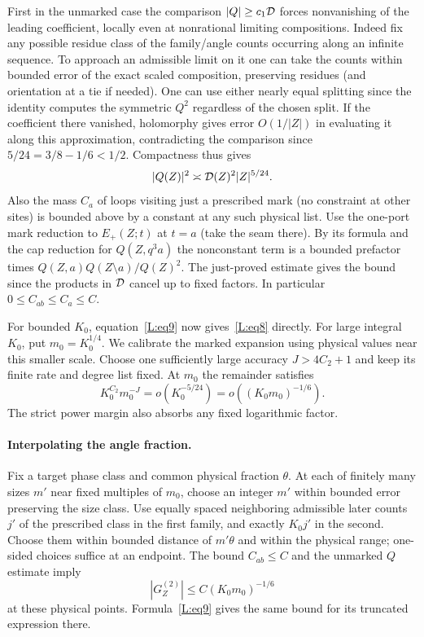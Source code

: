 \documentclass[11pt]{article}
\numberwithin{equation}{section}
\theoremstyle{definition}\newtheorem{definition}[theorem]{Definition}
\theoremstyle{remark}\newtheorem{remark}[theorem]{Remark}
\begin{document}
First in the unmarked case the comparison \(|Q|\ge c_1{\cal D}\) forces nonvanishing of the leading coefficient, locally even at nonrational limiting compositions. Indeed fix any possible residue class of the family/angle counts occurring along an infinite sequence. To approach an admissible limit on it one can take the counts within bounded error of the exact scaled composition, preserving residues (and orientation at a tie if needed). One can use either nearly equal splitting since the identity computes the symmetric \(Q^2\) regardless of the chosen split. If the coefficient there vanished, holomorphy gives error \(O(1/|Z|)\) in evaluating it along this approximation, contradicting the comparison since \(5/24=3/8-1/6<1/2\). Compactness thus gives
\[
 |Q(Z)|^2\asymp {\cal D}(Z)^2 |Z|^{5/24}.
\]
Also the mass \(C_a\) of loops visiting just a prescribed mark (no constraint at other sites) is bounded above by a constant at any such physical list. Use the one-port mark reduction to \(E_+(Z;t)\) at \(t=a\) (take the seam there). By its formula and the cap reduction for \(Q(Z,q^3a)\) the nonconstant term is a bounded prefactor times \(Q(Z,a)Q(Z\setminus a)/Q(Z)^2\). The just-proved estimate gives the bound since the products in \({\cal D}\) cancel up to fixed factors. In particular \(0\le C_{ab}\le C_a\le C\).

For bounded $K_0$, equation~\eqref{L:eq9} now gives~\eqref{L:eq8}
directly. For large integral $K_0$, put $m_0=K_0^{1/4}$. We calibrate
the marked expansion using physical values near this smaller scale.
Choose one sufficiently large accuracy $J>4C_2+1$ and keep its finite
rate and degree list fixed. At $m_0$ the remainder satisfies
\[
 K_0^{C_2}m_0^{-J}=o(K_0^{-5/24})
                   =o((K_0m_0)^{-1/6}).
\]
The strict power margin also absorbs any fixed logarithmic factor.

\paragraph{Interpolating the angle fraction.}
Fix a target phase class and common physical fraction $\theta$.
At each of finitely many sizes $m'$ near fixed multiples of $m_0$,
choose an integer $m'$ within bounded error preserving the size class.
Use equally spaced neighboring admissible later counts $j'$ of the
prescribed class in the first family, and exactly $K_0j'$ in the second.
Choose them within bounded distance of $m'\theta$ and within the physical
range; one-sided choices suffice at an endpoint. The bound $C_{ab}\le C$
and the unmarked $Q$ estimate imply
\[
 |G_Z^{(2)}|\le C(K_0m_0)^{-1/6}
\]
at these physical points. Formula~\eqref{L:eq9} gives the same bound for
its truncated expression there.
\end{document}
